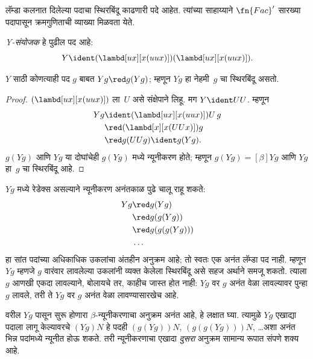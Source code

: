 \documentclass[../../../include/open-logic-section]{subfiles}
\begin{document}
लॅम्डा कलनात दिलेल्या पदाचा स्थिरबिंदू काढणारी
पदे आहेत. त्यांच्या साहाय्याने $\fn{Fac}'$
सारख्या पदापासून क्रमगुणिताची व्याख्या मिळवता येते.

\begin{defn}
  \emph{Y-संयोजक} हे पुढील पद आहे:
  \[
  Y \ident (\lambd[ux][x(uux)])(\lambd[ux][x(uux)]).
  \]
\end{defn}

\begin{thm}
  $Y$ साठी कोणत्याही पद $g$ बाबत $Yg \red g(Yg)$; म्हणून
  $Yg$ हा नेहमी~$g$ चा स्थिरबिंदू असतो.
\end{thm}

\begin{proof}
  $(\lambd[ux][x(uux)])$ ला~$U$ असे संक्षेपाने
  लिहू. मग $Y \ident UU$. म्हणून
  \begin{align*}
    Y g &\ident (\lambd[ux][x(uux)])U\,g \\
    &\red (\lambd[x][x(UUx)])g\\
    & \red g(UUg) \ident g(Yg).
  \end{align*}
  $g(Yg)$ आणि $Yg$ या दोघांचेही $g(Yg)$ मध्ये
  न्यूनीकरण होते; म्हणून $g(Yg) \equal[\beta]
  Yg$ आणि $Yg$ हा~$g$ चा स्थिरबिंदू आहे.
\end{proof}

$Yg$ मध्ये रेडेक्स असल्याने न्यूनीकरण अनंतकाळ
पुढे चालू राहू शकते:
\begin{align*}
  Y g &\red g (Y g) \\
    &\red g (g (Y g)) \\
    &\red g(g (g (Y g)))\\
    &\ldots
\end{align*}
हा सांत पदांच्या अधिकाधिक उकलांचा अंतहीन अनुक्रम आहे;
तो स्वतः एक अनंत लॅम्डा पद नाही. म्हणून $Yg$ म्हणजे $g$
वारंवार लावलेल्या उकलांनी व्यक्त केलेला स्थिरबिंदू असे
सहज अर्थाने समजू शकतो. त्याला $g$ आणखी एकदा
लावल्याने, बोलायचे तर, काहीच जास्त होत नाही:
$Yg$ वर $g$ अनंत वेळा लावल्यावर पुन्हा $g$
लावले, तरी ते $Yg$ वर $g$ अनंत वेळा लावण्यासारखेच आहे.

वरील $Yg$ पासून सुरू होणारा $\beta$-न्यूनीकरणाचा
अनुक्रम अनंत आहे, हे लक्षात घ्या. त्यामुळे $Yg$
एखाद्या पदाला लागू केल्यावरचे $(Yg)N$ हे पदही
$(g(Yg))N$, $(g(g(Yg)))N$, \dots अशा अनंत
भिन्न पदांमध्ये न्यूनीत होऊ शकते. तरी न्यूनीकरणाचा
एखादा \emph{दुसरा} अनुक्रम सामान्य रूपात संपणे
शक्य आहे.
\end{document}
